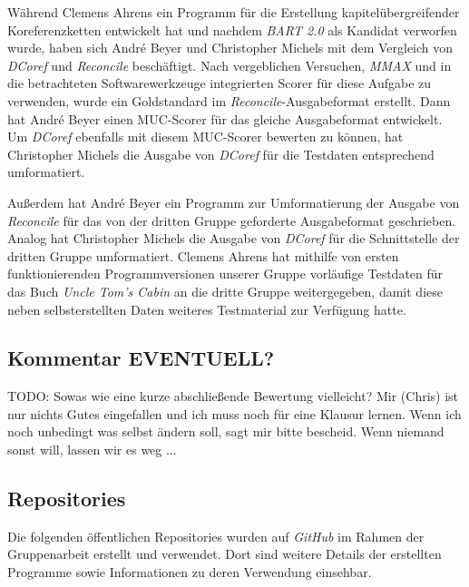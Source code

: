 \documentclass[a4paper,12pt,titlepage=true, ngerman]{scrartcl}
\begin{document}
Während Clemens Ahrens ein Programm für die Erstellung kapitelübergreifender Koreferenzketten entwickelt hat und nachdem \emph{BART 2.0} als Kandidat verworfen wurde, haben sich André Beyer und Christopher Michels mit dem Vergleich von \emph{DCoref} und \emph{Reconcile} beschäftigt. Nach vergeblichen Versuchen, \emph{MMAX} und in die betrachteten Softwarewerkzeuge integrierten Scorer für diese Aufgabe zu verwenden, wurde ein Goldstandard im \emph{Reconcile}-Ausgabeformat erstellt. Dann hat André Beyer einen MUC-Scorer für das gleiche Ausgabeformat entwickelt. Um \emph{DCoref} ebenfalls mit diesem MUC-Scorer bewerten zu können, hat Christopher Michels die Ausgabe von \emph{DCoref} für die Testdaten entsprechend umformatiert.

Außerdem hat André Beyer ein Programm zur Umformatierung der Ausgabe von \emph{Reconcile} für das von der dritten Gruppe geforderte Ausgabeformat geschrieben. Analog hat Christopher Michels die Ausgabe von \emph{DCoref} für die Schnittstelle der dritten Gruppe umformatiert. Clemens Ahrens hat mithilfe von ersten funktionierenden Programmversionen unserer Gruppe vorläufige Testdaten für das Buch \emph{Uncle Tom's Cabin} \autocite[]{chris_uncle} an die dritte Gruppe weitergegeben, damit diese neben selbsterstellten Daten weiteres Testmaterial zur Verfügung hatte.


\subsection{Kommentar EVENTUELL?}\label{Kommentar}%

TODO: Sowas wie eine kurze abschließende Bewertung vielleicht? Mir (Chris) ist nur nichts Gutes eingefallen und ich muss noch für eine Klausur lernen. Wenn ich noch unbedingt was selbst ändern soll, sagt mir bitte bescheid. Wenn niemand sonst will, lassen wir es weg ... 



\subsection{Repositories}\label{Repositories}%

Die folgenden öffentlichen Repositories wurden auf \emph{GitHub} \autocite[]{chris_github} im Rahmen der Gruppenarbeit erstellt und verwendet. Dort sind weitere Details der erstellten Programme sowie Informationen zu deren Verwendung einsehbar.
\end{document}
